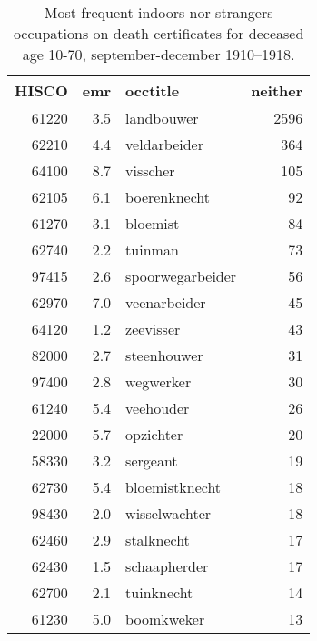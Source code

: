 \begin{table}

\caption{\label{tab:tab:topneither}Most frequent indoors nor strangers occupations on death certificates for deceased age 10-70, september-december 1910–1918.}
\centering
\begin{tabular}[t]{r|r|l|r}
\hline
HISCO & emr & occtitle & neither\\
\hline
61220 & 3.5 & landbouwer & 2596\\
\hline
62210 & 4.4 & veldarbeider & 364\\
\hline
64100 & 8.7 & visscher & 105\\
\hline
62105 & 6.1 & boerenknecht & 92\\
\hline
61270 & 3.1 & bloemist & 84\\
\hline
62740 & 2.2 & tuinman & 73\\
\hline
97415 & 2.6 & spoorwegarbeider & 56\\
\hline
62970 & 7.0 & veenarbeider & 45\\
\hline
64120 & 1.2 & zeevisser & 43\\
\hline
82000 & 2.7 & steenhouwer & 31\\
\hline
97400 & 2.8 & wegwerker & 30\\
\hline
61240 & 5.4 & veehouder & 26\\
\hline
22000 & 5.7 & opzichter & 20\\
\hline
58330 & 3.2 & sergeant & 19\\
\hline
62730 & 5.4 & bloemistknecht & 18\\
\hline
98430 & 2.0 & wisselwachter & 18\\
\hline
62460 & 2.9 & stalknecht & 17\\
\hline
62430 & 1.5 & schaapherder & 17\\
\hline
62700 & 2.1 & tuinknecht & 14\\
\hline
61230 & 5.0 & boomkweker & 13\\
\hline
\end{tabular}
\end{table}
